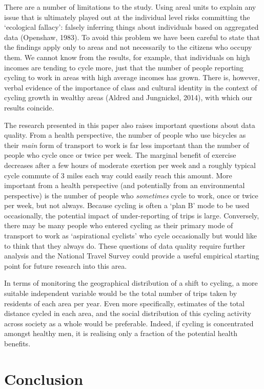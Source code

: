 There are a number of limitations to the study. Using areal units to
explain any issue that is ultimately played out at the individual level
risks committing the `ecological fallacy': falsely inferring things
about individuals based on aggregated data (Openshaw, 1983). To avoid
this problem we have been careful to state that the findings apply only
to areas and not necessarily to the citizens who occupy them. We cannot
know from the results, for example, that individuals on high incomes are
tending to cycle more, just that the number of people reporting cycling
to work in areas with high average incomes has grown. There is, however,
verbal evidence of the importance of class and cultural identity in the
context of cycling growth in wealthy areas (Aldred and Jungnickel,
2014), with which our results coincide.

The research presented in this paper also raises important questions
about data quality. From a health perspective, the number of people who
use bicycles as their \emph{main} form of transport to work is far less
important than the number of people who cycle once or twice per week.
The marginal benefit of exercise decreases after a few hours of moderate
exertion per week and a roughly typical cycle commute of 3 miles each
way could easily reach this amount. More important from a health
perspective (and potentially from an environmental perspective) is the
number of people who \emph{sometimes} cycle to work, once or twice per
week, but not always. Because cycling is often a `plan B' mode to be
used occasionally, the potential impact of under-reporting of trips is
large. Conversely, there may be many people who entered cycling as their
primary mode of transport to work as `aspirational cyclists' who cycle
occasionally but would like to think that they always do. These
questions of data quality require further analysis and the National
Travel Survey could provide a useful empirical starting point for future
research into this area.

In terms of monitoring the geographical distribution of a shift to
cycling, a more suitable independent variable would be the total number
of trips taken by residents of each area per year. Even more
specifically, estimates of the total distance cycled in each area, and
the social distribution of this cycling activity across society as a
whole would be preferable. Indeed, if cycling is concentrated amongst
healthy men, it is realising only a fraction of the potential health
benefits.

\section{Conclusion}\label{conclusion}

